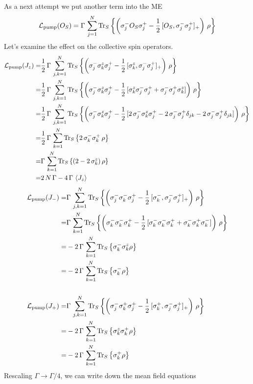\documentclass{article}
\begin{document}
As a next attempt we put another term into the ME
\begin{align*}
    \mathcal{L}_\text{pump}(O_S)=\Gamma\,\sum_{j=1}^N \operatorname{Tr}_S\left\{\left( \sigma_j^- O_S \sigma_j^+ -\frac{1}{2}\,[O_S,\sigma_j^-\sigma_j^+]_+  \right)\,\rho \right\}
\end{align*}
Let's examine the effect on the collective spin operators.
\begin{align*}
    \mathcal{L}_\text{pump}(J_z)=&\frac{1}{2}\,\Gamma\,\sum_{j,k=1}^N \operatorname{Tr}_S\left\{\left( \sigma_j^- \sigma_k^z \sigma_j^+ -\frac{1}{2}\,[\sigma_k^z,\sigma_j^-\sigma_j^+]_+   \right)\,\rho\right\}\\
    =&\frac{1}{2}\,\Gamma\,\sum_{j,k=1}^N \operatorname{Tr}_S\left\{\left( \sigma_j^- \sigma_k^z \sigma_j^+ -\frac{1}{2}\,[\sigma_k^z\sigma_j^-\sigma_j^++\sigma_j^-\sigma_j^+\sigma_k^z]   \right)\,\rho\right\}\\
    =&\frac{1}{2}\,\Gamma\,\sum_{j,k=1}^N \operatorname{Tr}_S\left\{\left( \sigma_j^- \sigma_k^z \sigma_j^+ -\frac{1}{2}\,[2\,\sigma_j^-\sigma_k^z\sigma_j^+  -2\, \sigma_j^-\sigma_j^+\delta_{jk}-2\, \sigma_j^-\sigma_j^+\delta_{jk}]   \right)\,\rho\right\}\\
    =&\frac{1}{2}\,\Gamma\,\sum_{k=1}^N \operatorname{Tr}_S\left\{2\, \sigma_k^-\sigma_k^+  \,\rho\right\}\\
    =&\Gamma\,\sum_{k=1}^N \operatorname{Tr}_S\left\{ (2-2\,\sigma_k^z)  \,\rho\right\}\\
    =&2\,N\,\Gamma-4\,\Gamma\,\braket{J_z}
\end{align*}
\begin{align*}
    \mathcal{L}_\text{pump}(J_-)=&\Gamma\,\sum_{j,k=1}^N \operatorname{Tr}_S\left\{\left( \sigma_j^- \sigma_k^- \sigma_j^+ -\frac{1}{2}\,[\sigma_k^-,\sigma_j^-\sigma_j^+]_+   \right)\,\rho\right\}\\
    =&\Gamma\,\sum_{k=1}^N \operatorname{Tr}_S\left\{\left( \sigma_k^- \sigma_k^- \sigma_k^+ -\frac{1}{2}\,[\sigma_k^-\sigma_k^-\sigma_k^++\sigma_k^-\sigma_k^+\sigma_k^-]   \right)\,\rho\right\}\\
    =&-2\,\Gamma\,\sum_{k=1}^N\operatorname{Tr}_S\left\{\sigma_k^-\sigma_k^z\rho\right\}\\
    =&-2\,\Gamma\,\sum_{k=1}^N\operatorname{Tr}_S\left\{\sigma_k^-\rho\right\}\\\\
    \mathcal{L}_\text{pump}(J_+)=&\Gamma\,\sum_{j,k=1}^N \operatorname{Tr}_S\left\{\left( \sigma_j^- \sigma_k^+ \sigma_j^+ -\frac{1}{2}\,[\sigma_k^+,\sigma_j^-\sigma_j^+]_+   \right)\,\rho\right\}\\
    =&-2\,\Gamma\,\sum_{k=1}^N\operatorname{Tr}_S\left\{\sigma_k^z\sigma_k^+\rho\right\}\\
    =&-2\,\Gamma\,\sum_{k=1}^N\operatorname{Tr}_S\left\{\sigma_k^+\rho\right\}
\end{align*}
Rescaling $\Gamma\rightarrow\Gamma/4$, we can write down the mean field equations
\end{document}
